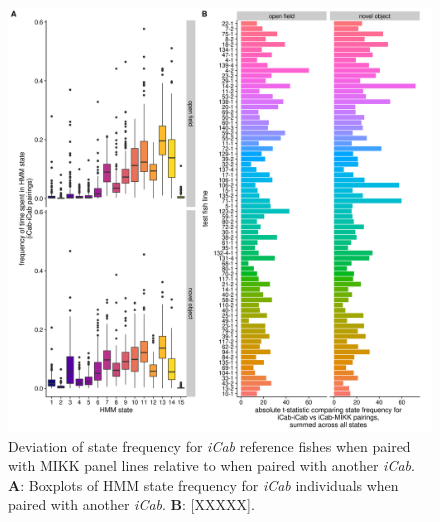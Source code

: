 \documentclass[
]{book}
\begin{document}
\begin{figure}
\includegraphics[width=1\linewidth]{figs/mikk_behaviour/0.08_15_deviation} \caption{Deviation of state frequency for \emph{\textcolor{iCab_424B4D}{iCab}} reference fishes when paired with MIKK panel lines relative to when paired with another \emph{\textcolor{iCab_424B4D}{iCab}}. \textbf{A}: Boxplots of HMM state frequency for \emph{\textcolor{iCab_424B4D}{iCab}} individuals when paired with another \emph{\textcolor{iCab_424B4D}{iCab}}. \textbf{B}: {[}XXXXX{]}.}\label{fig:F0-sge-deviation}
\end{figure}
\end{document}
